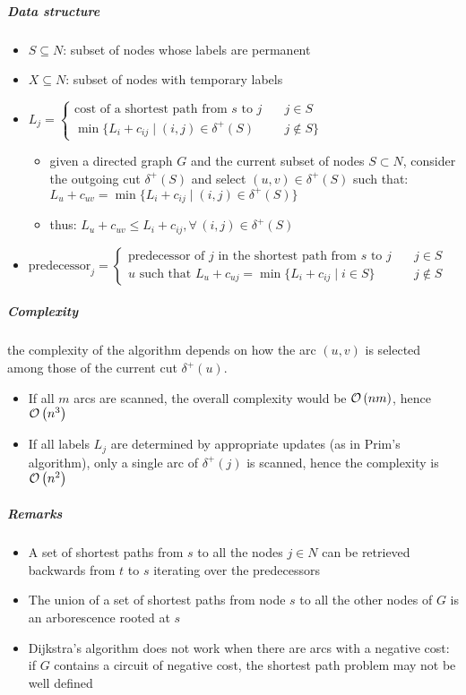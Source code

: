 \documentclass[english]{article}
\begin{document}
\subparagraph*{Data structure}
\begin{itemize}
  \item \(S \subseteq N\): subset of nodes whose labels are permanent
  \item \(X \subseteq N\): subset of nodes with temporary labels
  \item \(L_j = \begin{cases} \text{cost of a shortest path from } s \text{ to } j \quad & j \in S \\ \min\{L_i + c_{ij} \mid   (i, j) \in \delta^+(S) & j \notin S\}\end{cases}\)
        \begin{itemize}[label=\(\rightarrow\)]
          \item given a directed graph \(G\) and the current subset of nodes \(S \subset N\), consider the outgoing cut \(\delta^+(S)\) and select \((u, v) \in \delta^+(S)\) such that: \( L_u + c_{uv} = \min\{L_i + c_{ij} \mid   (i, j) \in \delta^+ (S)\}\)
          \item thus: \(L_u + c_{uv} \leq L_i + c_{ij}, \forall \, (i, j) \in \delta^+(S)\)
        \end{itemize}
  \item \(\text{predecessor}_j = \begin{cases}\text{predecessor of } j \text{ in the shortest path from } s \text{ to } j \quad& j \in S \\ u \text{ such that } L_u + c_{uj} = \min\{L_i + c_{ij} \mid   i \in S\} & j \notin S\end{cases}\)
\end{itemize}

\subparagraph*{Complexity}
the complexity of the algorithm depends on how the arc \((u, v)\) is selected among those of the current cut \(\delta^+(u)\).
\begin{itemize}
  \item If all \(m\) arcs are scanned, the overall complexity would be \(\mathcal{O}\left(nm\right)\), hence \(\mathcal{O}\left(n^3\right)\)
  \item If all labels \(L_j\) are determined by appropriate updates (as in Prim's algorithm), only a single arc of \(\delta^+(j)\) is scanned, hence the complexity is \(\mathcal{O}\left(n^2\right)\)
\end{itemize}

\subparagraph*{Remarks}
\begin{itemize}
  \item A set of shortest paths from \(s\) to all the nodes \(j \in N\) can be retrieved backwards from \(t\) to \(s\) iterating over the predecessors
  \item The union of a set of shortest paths from node \(s\) to all the other nodes of \(G\) is an arborescence rooted at \(s\)
  \item Dijkstra's algorithm does not work when there are arcs with a negative cost: if \(G\) contains a circuit of negative cost, the shortest path problem may not be well defined
\end{itemize}
\end{document}
